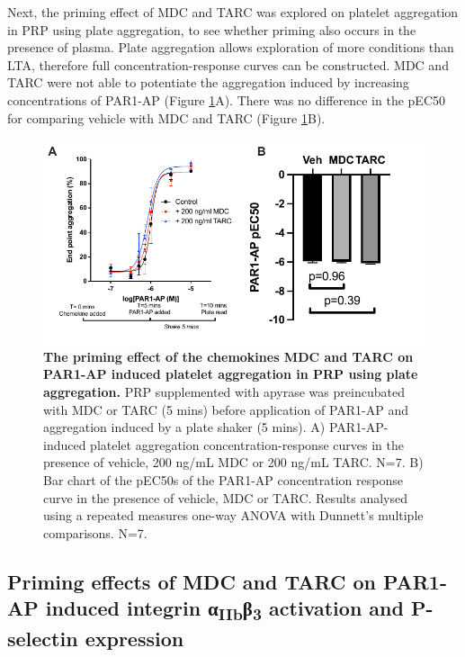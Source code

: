 \documentclass[11pt,twoside]{bristolthesis}
\begin{document}
Next, the priming effect of MDC and TARC was explored on platelet aggregation in PRP using plate aggregation, to see whether priming also occurs in the presence of plasma. Plate aggregation allows exploration of more conditions than LTA, therefore full concentration-response curves can be constructed. MDC and TARC were not able to potentiate the aggregation induced by increasing concentrations of PAR1-AP (Figure \ref{fig:MDC-TARC-agg-PRP}A). There was no difference in the pEC50 for comparing vehicle with MDC and TARC (Figure \ref{fig:MDC-TARC-agg-PRP}B).



\begin{figure}

{\centering \includegraphics{figure/Chemokines/Layouts/MDC_TARC_PRP_plate_agg} 

}

\caption[The priming effect of the chemokines MDC and TARC on PAR1-AP induced platelet aggregation in PRP using plate aggregation]{\textbf{The priming effect of the chemokines MDC and TARC on PAR1-AP induced platelet aggregation in PRP using plate aggregation.} PRP supplemented with apyrase was preincubated with MDC or TARC (5 mins) before application of PAR1-AP and aggregation induced by a plate shaker (5 mins). A) PAR1-AP-induced platelet aggregation concentration-response curves in the presence of vehicle, 200 ng/mL MDC or 200 ng/mL TARC. N=7. B) Bar chart of the pEC50s of the PAR1-AP concentration response curve in the presence of vehicle, MDC or TARC. Results analysed using a repeated measures one-way ANOVA with Dunnett's multiple comparisons. N=7.}\label{fig:MDC-TARC-agg-PRP}
\end{figure}
\hypertarget{priming-effects-of-mdc-and-tarc-on-par1-ap-induced-integrin-ux3b1iibux3b23-activation-and-p-selectin-expression}{%
\subsection{\texorpdfstring{Priming effects of MDC and TARC on PAR1-AP induced integrin α\textsubscript{IIb}β\textsubscript{3} activation and P-selectin expression}{Priming effects of MDC and TARC on PAR1-AP induced integrin αIIbβ3 activation and P-selectin expression}}\label{priming-effects-of-mdc-and-tarc-on-par1-ap-induced-integrin-ux3b1iibux3b23-activation-and-p-selectin-expression}}
\end{document}
